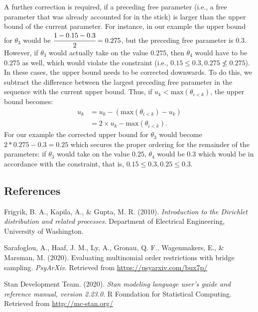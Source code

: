 \documentclass[
  english,
  man,floatsintext]{apa6}
\newlength{\cslhangindent}
\newenvironment{cslreferences}%
  {\setlength{\parindent}{0pt}%
  \everypar{\setlength{\hangindent}{\cslhangindent}}\ignorespaces}%
  {\par}
\begin{document}
\begin{appendix}
A further correction is required, if a preceding free parameter (i.e., a
free parameter that was already accounted for in the stick) is larger
than the upper bound of the current parameter. For instance, in our
example the upper bound for \(\theta_3\) would be
\(\cfrac{1 - 0.15 - 0.3}{2} = 0.275\), but the preceding free parameter
is \(0.3\). However, if \(\theta_3\) would actually take on the value
\(0.275\), then \(\theta_4\) would have to be \(0.275\) as well, which
would violate the constraint (i.e.,
\(0.15 \leq 0.3, 0.275 \nleq 0.275\)). In these cases, the upper bound
needs to be corrected downwards. To do this, we subtract the difference
between the largest preceding free parameter in the sequence with the
current upper bound. Thus, if \(u_k < \text{max}(\theta_{i < k})\), the
upper bound becomes: \begin{align}
u_k &= u_k - (\text{max}(\theta_{i < k}) - u_k) \\
&= 2 \times u_k - \text{max}(\theta_{i < k}).
\end{align} For our example the corrected upper bound for \(\theta_3\)
would become \(2*0.275 - 0.3 = 0.25\) which secures the proper ordering
for the remainder of the parameters: if \(\theta_3\) would take on the
value \(0.25\), \(\theta_4\) would be \(0.3\) which would be in
accordance with the constraint, that is,
\(0.15 \leq 0.3, 0.25 \leq 0.3\).

\hypertarget{references}{%
\subsection{References}\label{references}}

\begingroup
\setlength{\parindent}{-0.5in}
\setlength{\leftskip}{0.5in}

\hypertarget{refs}{}
\begin{cslreferences}
\leavevmode\hypertarget{ref-frigyik2010introduction}{}%
Frigyik, B. A., Kapila, A., \& Gupta, M. R. (2010). \emph{Introduction
to the Dirichlet distribution and related processes}. Department of
Electrical Engineering, University of Washington.

\leavevmode\hypertarget{ref-sarafoglou2020evaluatingPreprint}{}%
Sarafoglou, A., Haaf, J. M., Ly, A., Gronau, Q. F., Wagenmakers, E., \&
Marsman, M. (2020). Evaluating multinomial order restrictions with
bridge sampling. \emph{PsyArXiv}. Retrieved from
\url{https://psyarxiv.com/bux7p/}

\leavevmode\hypertarget{ref-stan2020}{}%
Stan Development Team. (2020). \emph{Stan modeling language user's guide
and reference manual, version 2.23.0}. R Foundation for Statistical
Computing. Retrieved from \url{http://mc-stan.org/}
\end{cslreferences}

\endgroup
\end{appendix}
\end{document}

